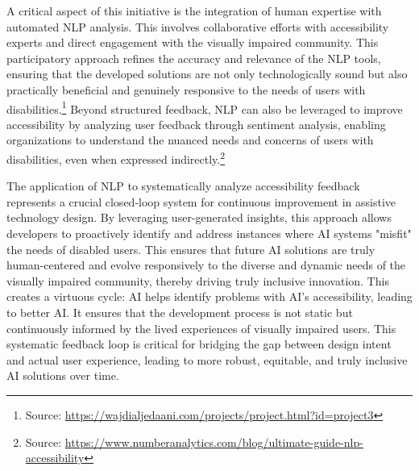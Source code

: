 A critical aspect of this initiative is the integration of human expertise with automated NLP analysis. This involves collaborative efforts with accessibility experts and direct engagement with the visually impaired community. This participatory approach refines the accuracy and relevance of the NLP tools, ensuring that the developed solutions are not only technologically sound but also practically beneficial and genuinely responsive to the needs of users with disabilities.\footnote{Source: \url{https://wajdialjedaani.com/projects/project.html?id=project3}} Beyond structured feedback, NLP can also be leveraged to improve accessibility by analyzing user feedback through sentiment analysis, enabling organizations to understand the nuanced needs and concerns of users with disabilities, even when expressed indirectly.\footnote{Source: \url{https://www.numberanalytics.com/blog/ultimate-guide-nlp-accessibility}}

The application of NLP to systematically analyze accessibility feedback represents a crucial closed-loop system for continuous improvement in assistive technology design. By leveraging user-generated insights, this approach allows developers to proactively identify and address instances where AI systems "misfit" the needs of disabled users. This ensures that future AI solutions are truly human-centered and evolve responsively to the diverse and dynamic needs of the visually impaired community, thereby driving truly inclusive innovation. This creates a virtuous cycle: AI helps identify problems with AI's accessibility, leading to better AI. It ensures that the development process is not static but continuously informed by the lived experiences of visually impaired users. This systematic feedback loop is critical for bridging the gap between design intent and actual user experience, leading to more robust, equitable, and truly inclusive AI solutions over time.

